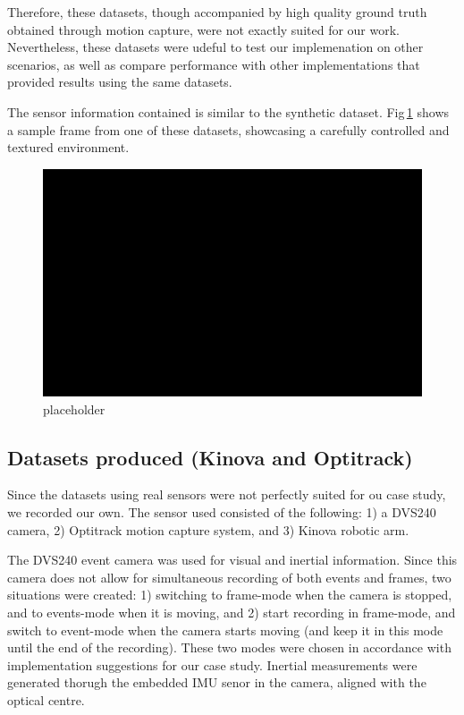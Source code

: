 \documentclass[10pt,twocolumn]{IEEEtran}
\begin{document}
Therefore, these datasets, though accompanied by high quality ground truth obtained through motion capture, were not exactly suited for our work. Nevertheless, these datasets were udeful to test our implemenation on other scenarios, as well as compare performance with other implementations that provided results using the same datasets.

The sensor information contained is similar to the synthetic dataset. Fig\,\ref{fig:w13_shapes} shows a sample frame from one of these datasets, showcasing a carefully controlled and textured environment.

\begin{figure}[ht]
    \centering
    \includegraphics[width = 1\linewidth]{placeholder.png}
    \caption[]{placeholder}
    \label{fig:w13_shapes}
\end{figure}

\subsection{Datasets produced (Kinova and Optitrack)}
\label{sec:w13_kinova}

Since the datasets using real sensors were not perfectly suited for ou case study, we recorded our own. The sensor used consisted of the following: 1) a DVS240 camera, 2) Optitrack motion capture system, and 3) Kinova robotic arm.

The DVS240 event camera was used for visual and inertial information. Since this camera does not allow for simultaneous recording of both events and frames, two situations were created: 1) switching to frame-mode when the camera is stopped, and to events-mode when it is moving, and 2) start recording in frame-mode, and switch to event-mode when the camera starts moving (and keep it in this mode until the end of the recording). These two modes were chosen in accordance with implementation suggestions for our case study. Inertial measurements were generated thorugh the embedded IMU senor in the camera, aligned with the optical centre.
\end{document}
